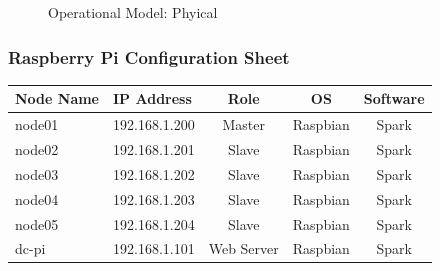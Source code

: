 \documentclass[12pt]{article} %
\begin{document}
	
	
	
		\begin{figure}[H] %
			\caption{Operational Model: Phyical}
			\label{fig:speciation}
		\end{figure}
		
	
	\subsubsection {Raspberry Pi Configuration Sheet}

	\begin{center}
		\begin{tabular}{ | p{3cm} | p{3cm} | c | c | c |}
			\hline
			\textbf {Node Name} & \textbf {IP Address} & \textbf {Role} & \textbf {OS} & \textbf {Software}  \\
			\hline
			node01 & 192.168.1.200 & Master & Raspbian & Spark\\
			\hline
			node02 & 192.168.1.201 & Slave & Raspbian & Spark\\
			\hline
			node03 & 192.168.1.202 & Slave & Raspbian & Spark\\
			\hline
			node04 & 192.168.1.203 & Slave & Raspbian & Spark\\
			\hline
			node05 & 192.168.1.204 & Slave & Raspbian & Spark\\
			\hline
			dc-pi  & 192.168.1.101 & Web Server & Raspbian & Spark\\
			\hline
		\end{tabular}
	\end{center}

	
	
\end{document}
